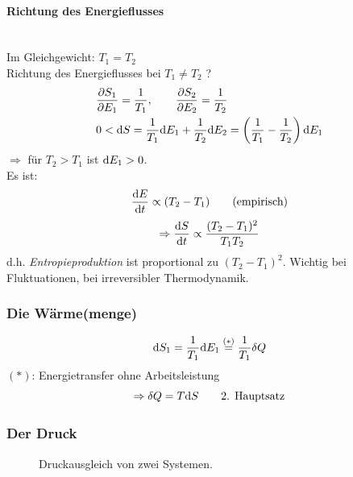 \paragraph{Richtung des Energieflusses} \mbox{}\\
Im Gleichgewicht: $T_1 = T_2$ \\
Richtung des Energieflusses bei $T_1 \neq T_2$ ?
\begin{equation}
    \begin{split}
        & \frac{\partial S_1}{\partial E_1} = \frac{1}{T_1}, \qquad \frac{\partial S_2}{\partial E_2} = \frac{1}{T_2} \\
        & 0 < \mathrm{d} S = \frac{1}{T_1} \mathrm{d} E_1 + \frac{1}{T_2} \mathrm{d} E_2 = \left( \frac{1}{T_1} - \frac{1}{T_2} \right) \mathrm{d} E_1
    \end{split}
\end{equation}
$\Rightarrow$ für $T_2 > T_1$ ist $\mathrm{d} E_1 > 0$. \\
Es ist:
\begin{equation}
    \frac{\mathrm{d} E}{\mathrm{d} t} \propto (T_2 - T_1) \qquad \text{(empirisch)}
\end{equation}
\begin{equation}
    \Rightarrow \frac{\mathrm{d} S}{\mathrm{d} t} \propto \frac{(T_2 - T_1)^2}{T_1 T_2}
\end{equation}
d.h. \emph{Entropieproduktion} ist proportional zu $(T_2 - T_1)^2$. Wichtig bei Fluktuationen, bei irreversibler Thermodynamik.

\subsubsection{Die Wärme(menge)}
\begin{equation}
    \mathrm{d} S_1 = \frac{1}{T_1} \mathrm{d} E_1 \overset{(*)}{=} \frac{1}{T_1} \delta Q
\end{equation}
$(*)$: Energietransfer ohne Arbeitsleistung
\begin{equation}
    \Rightarrow \delta Q = T \mathrm{d} S \qquad \text{2. Hauptsatz}
\end{equation}
\subsubsection{Der Druck}

    \begin{figure}[H]
        \centering
        \def\svgwidth{0.85\textwidth}
        
        \caption{Druckausgleich von zwei Systemen.}
        \label{img:derivationP}
    \end{figure}

